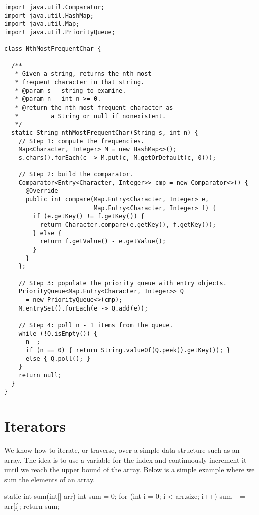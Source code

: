 \begin{lstlisting}[language=MyJava]
import java.util.Comparator;
import java.util.HashMap;
import java.util.Map;
import java.util.PriorityQueue;

class NthMostFrequentChar {

  /**
   * Given a string, returns the nth most 
   * frequent character in that string.
   * @param s - string to examine.
   * @param n - int n >= 0.
   * @return the nth most frequent character as 
   *         a String or null if nonexistent.
   */
  static String nthMostFrequentChar(String s, int n) {
    // Step 1: compute the frequencies.
    Map<Character, Integer> M = new HashMap<>();
    s.chars().forEach(c -> M.put(c, M.getOrDefault(c, 0))); 

    // Step 2: build the comparator.
    Comparator<Entry<Character, Integer>> cmp = new Comparator<>() {
      @Override
      public int compare(Map.Entry<Character, Integer> e, 
                         Map.Entry<Character, Integer> f) {
        if (e.getKey() != f.getKey()) {
          return Character.compare(e.getKey(), f.getKey());
        } else {
          return f.getValue() - e.getValue();
        }
      }
    };

    // Step 3: populate the priority queue with entry objects.
    PriorityQueue<Map.Entry<Character, Integer>> Q 
      = new PriorityQueue<>(cmp);
    M.entrySet().forEach(e -> Q.add(e));

    // Step 4: poll n - 1 items from the queue.
    while (!Q.isEmpty()) {
      n--;
      if (n == 0) { return String.valueOf(Q.peek().getKey()); } 
      else { Q.poll(); }
    }
    return null;
  }
}
\end{lstlisting}

\section{Iterators}
We know how to iterate, or traverse, over a simple data structure such as an array. 
The idea is to use a variable for the index and continuously increment it until we reach the upper bound of the array. 
Below is a simple example where we sum the elements of an array.

\begin{verbnobox}[\small]
static int sum(int[] arr) {
  int sum = 0;
  for (int i = 0; i < arr.size; i++) { sum += arr[i]; }
  return sum;
}
\end{verbnobox}

